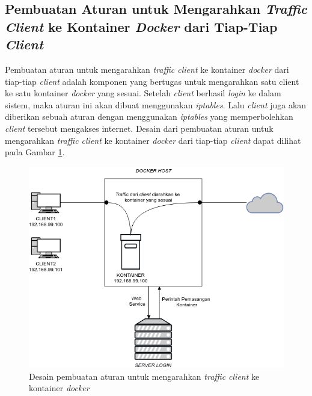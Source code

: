    	\subsection{Pembuatan Aturan untuk Mengarahkan \textit{Traffic Client} ke Kontainer \textit{Docker} dari Tiap-Tiap \textit{Client}}
   	Pembuatan aturan untuk mengarahkan \textit{traffic client} ke kontainer \textit{docker} dari tiap-tiap \textit{client} adalah komponen yang bertugas untuk mengarahkan satu client ke satu kontainer \textit{docker} yang sesuai. Setelah \textit{client} berhasil \textit{login} ke dalam sistem, maka aturan ini akan dibuat menggunakan \textit{iptables}. Lalu \textit{client} juga akan diberikan sebuah aturan dengan menggunakan \textit{iptables} yang memperbolehkan \textit{client} tersebut mengakses internet. Desain dari pembuatan aturan untuk mengarahkan \textit{traffic client} ke kontainer \textit{docker} dari tiap-tiap \textit{client} dapat dilihat pada Gambar \ref{mengarahkankontainerdocker}.
   	
	\begin{figure}[H]
		\centering
		\includegraphics[width=\linewidth]{images/bab3/DIAGRAM3}
		\caption{Desain pembuatan aturan untuk mengarahkan \textit{traffic client} ke kontainer \textit{docker}}
		\label{mengarahkankontainerdocker}
	\end{figure}
